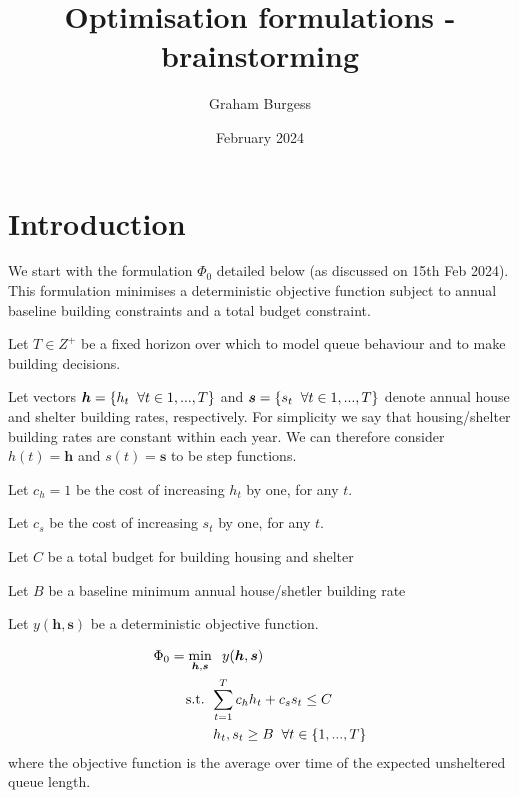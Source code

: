 \documentclass{article}
\title{Optimisation formulations - brainstorming}
\author{Graham Burgess}
\date{February 2024}
\begin{document}
%
\maketitle
\section{Introduction}
%
We start with the formulation $\Phi_0$ detailed below (as discussed on 15th Feb 2024). This formulation minimises a deterministic objective function subject to annual baseline building constraints and a total budget constraint. \par
%
Let $T \in Z^{+}$ be a fixed horizon over which to model queue behaviour and to make building decisions. \par
%
Let vectors $\boldsymbol{h} = \{h_t \hspace{0.2cm} \forall t \in {1,...,T}\}$ and $\boldsymbol{s} = \{s_t \hspace{0.2cm} \forall t \in {1,...,T}\}$ denote annual house and shelter building rates, respectively. For simplicity we say that housing/shelter building rates are constant within each year. We can therefore consider $h(t) = \boldsymbol{h}$ and $s(t) = \boldsymbol{s}$ to be step functions. \par
%
Let $c_{h} = 1$ be the cost of increasing $h_t$ by one, for any $t$. \par
%
Let $c_{s}$ be the cost of increasing $s_t$ by one, for any $t$. \par
%
Let $C$ be a total budget for building housing and shelter \par
%
Let $B$ be a baseline minimum annual house/shetler building rate \par
%
Let $y(\boldsymbol{h},\boldsymbol{s})$ be a deterministic objective function. \par
%
\begin{align*}
        & \Phi_0 = \min_{\boldsymbol{h},\boldsymbol{s}} \hspace{0.2cm} y(\boldsymbol{h},\boldsymbol{s}) \\
        & \hspace{0.7cm} \text{ s.t. } \sum_{t=1}^{T} c_{h}h_{t} + c_{s}s_{t} \leq C \\
        & \hspace{1.5cm} h_t, s_t \geq B \hspace{0.2cm} \forall t \in \{1, ..., T\}
\end{align*}
%
where the objective function is the average over time of the expected unsheltered queue length. 
\end{document}
